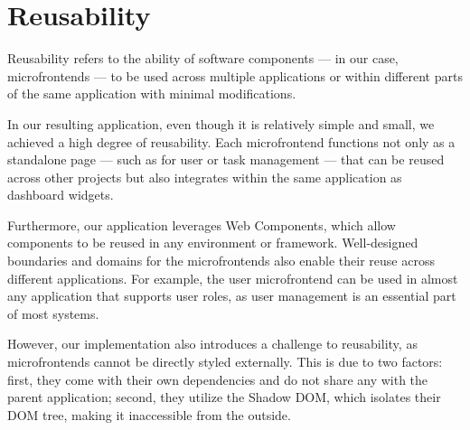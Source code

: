 \section{Reusability}
Reusability refers to the ability of software components — in our case, microfrontends — to be used across multiple applications or within different parts of the same application with minimal modifications.

In our resulting application, even though it is relatively simple and small, we achieved a high degree of reusability. Each microfrontend functions not only as a standalone page — such as for user or task management — that can be reused across other projects but also integrates within the same application as dashboard widgets.

Furthermore, our application leverages Web Components, which allow components to be reused in any environment or framework. Well-designed boundaries and domains for the microfrontends also enable their reuse across different applications. For example, the user microfrontend can be used in almost any application that supports user roles, as user management is an essential part of most systems.

However, our implementation also introduces a challenge to reusability, as microfrontends cannot be directly styled externally. This is due to two factors: first, they come with their own dependencies and do not share any with the parent application; second, they utilize the Shadow DOM, which isolates their DOM tree, making it inaccessible from the outside.
